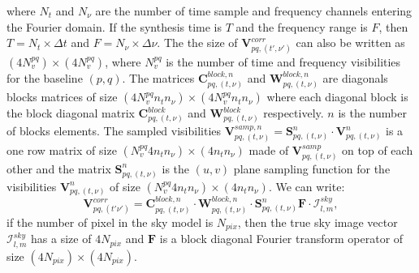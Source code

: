 \documentclass[useAMS,usenatbib]{mn2e}
\begin{document}
where $N_t$ and  $N_{\nu}$ are the number of time sample and frequency channels entering the Fourier domain. If the synthesis time is $T$ 
and the frequency range is $F$, then $T=N_t \times \Delta t$ and $F=N_{\nu}\times\Delta \nu$. The the size of 
$\mathbf{V}_{pq,(t',\nu')}^{corr}$ can also be written as $(4N_v^{pq})\times (4N_v^{pq})$, where $N_v^{pq}$ is the 
number of time and frequency visibilities for the baseline $(p,q)$. The matrices
$\mathbf{C}_{pq,(t,\nu)}^{block,n}$ and $\mathbf{W}_{pq,(t,\nu)}^{block,n}$ are diagonals blocks 
matrices of size $(4N_v^{pq}n_t n_{\nu})\times (4N_v^{pq}n_t n_{\nu})$ where each diagonal block is the block diagonal matrix  
$\mathbf{C}_{pq,(t,\nu)}^{block}$ and $\mathbf{W}_{pq,(t,\nu)}^{block}$ respectively. $n$ is the number of blocks 
elements. The sampled  visibilities 
$\textbf{V}_{pq,(t,\nu)}^{samp,n}=\mathcal{\textbf{S}}_{pq,(t,\nu)}^{n}\cdot\mathbf{V}_{pq,(t,\nu)}^{n}$ is a one row matrix of size 
$(N_v^{pq}4 n_t n_{\nu})\times (4 n_t n_{\nu})$ made of $\textbf{V}_{pq,(t,\nu)}^{samp}$ on top of each other and the matrix 
$\mathcal{\textbf{S}}_{pq,(t,\nu)}^{n}$ is the $(u,v)$ plane sampling function for the visibilities $\mathbf{V}_{pq,(t,\nu)}^{n}$ of size  
$(N_v^{pq}4 n_t n_{\nu})\times (4 n_t n_{\nu})$. We can write:
\begin{equation}
\mathbf{V}_{pq,(t' \nu')}^{corr}= 
\mathbf{C}_{pq,(t,\nu)}^{block,n}\cdot\mathbf{W}_{pq,(t,\nu)}^{block,n}\cdot 
\mathbf{S}_{pq,(t,\nu)}^{n}\mathbf{F}\cdot\mathcal{I}_{l,m}^{sky },\label{eqv:linear}
\end{equation}
if the number of pixel in the sky model is $N_{pix}$, then the true sky image vector $\mathcal{I}_{l,m}^{sky}$ has a size of $4N_{pix}$ and 
$\textbf{F}$ is a block diagonal Fourier transform operator of size $(4N_{pix})\times(4N_{pix})$. 
\end{document}
